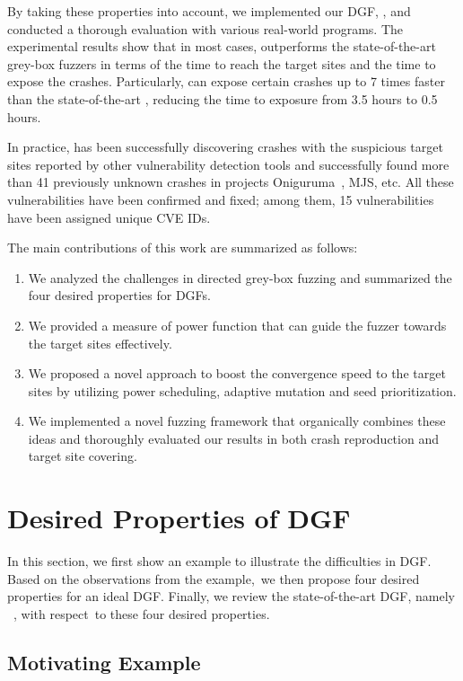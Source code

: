 By taking these properties into account, we implemented our DGF, {\dFOT}, and conducted a thorough evaluation with various real-world programs. 
The experimental results show that in most cases, {\dFOT} outperforms the state-of-the-art grey-box fuzzers in terms of the time to reach the target sites and the time to expose the crashes.
Particularly, {\dFOT} can expose certain crashes up to 7 times faster than the state-of-the-art \aflgo, reducing the time to exposure from 3.5 hours to 0.5 hours.

In practice, \dFOT has been successfully discovering crashes with the suspicious target sites reported by other vulnerability detection tools and successfully found more than 41 previously unknown crashes in projects Oniguruma~\cite{oniguruma}, MJS\cite{mjs}, etc. All these vulnerabilities have been confirmed and fixed; among them, 15 vulnerabilities have been assigned unique CVE IDs.

The main contributions of this work are summarized as follows:
\begin{enumerate}[(1)] 
\itemsep0em
\item We analyzed the challenges in directed grey-box fuzzing and summarized the four desired properties for DGFs.
\item We provided a measure of power function that can guide the fuzzer towards the target sites effectively.
\item We proposed a novel approach to boost the convergence speed to the target sites by utilizing power scheduling, adaptive mutation and seed prioritization.
\item We implemented a novel fuzzing framework that organically combines these ideas and thoroughly evaluated our results in both crash reproduction and target site covering.
\end{enumerate} 

\section{Desired Properties of DGF}\label{sec:mx}

In this section, we first show an example to illustrate the difficulties in DGF.
Based on the observations from the example,~we then propose four desired properties for an ideal DGF.
Finally, we review the state-of-the-art DGF, namely \aflgo~\cite{Bohme:2017:DGF}, with respect~to these four desired properties. 


\subsection{Motivating Example}\label{subsec:motiv}



